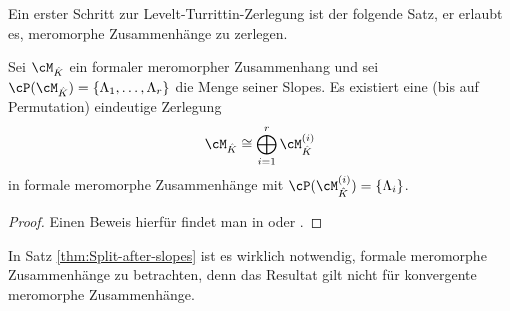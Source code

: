 Ein erster Schritt zur Levelt-Turrittin-Zerlegung ist der folgende Satz, er
erlaubt es, meromorphe Zusammenhänge  zu
zerlegen.
\begin{thm} \label{thm:Split-after-slopes}
Sei $\cM_{\hat{K}}$ ein formaler meromorpher Zusammenhang und sei
$\cP(\cM_{\hat K})=\{\Lambda_1,\dots,\Lambda_r\}$ die Menge seiner
Slopes. Es existiert eine (bis auf Permutation) eindeutige Zerlegung
\[
\cM_{\hat K}\cong\bigoplus_{i=1}^r\cM_{\hat K}^{(i)}
\]
in formale meromorphe Zusammenhänge
mit $\cP(\cM_{\hat K}^{(i)})=\{\Lambda_i\}$.
\end{thm}
\begin{proof}
Einen Beweis hierfür findet man in \cite[Thm 5.3.1]{sabbah_cimpa90} oder
\cite[5.15]{ZulaBarbara}.
\end{proof}
\begin{bem}
In Satz \ref{thm:Split-after-slopes} ist es wirklich notwendig, formale
meromorphe Zusammenhänge zu betrachten, denn das Resultat gilt nicht für
konvergente meromorphe Zusammenhänge.
\end{bem}
